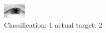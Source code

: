 \begin{figure}[h!]
\begin{center}
\includegraphics[width=0.60\columnwidth]{figures/ID2344_class_1_target_2.png}
\end{center}
\caption{ Classification: 1 actual target: 2}
\label{fig:ID2344_class_1_target_2}
\end{figure}
